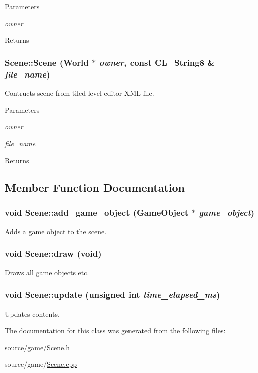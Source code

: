 \begin{DoxyParams}{Parameters}
\item[{\em owner}]\end{DoxyParams}
\begin{DoxyReturn}{Returns}

\end{DoxyReturn}
\hypertarget{classScene_a2da1c2abcd1bde49c978e403c9748b04}{
\subsubsection[{Scene}]{\setlength{\rightskip}{0pt plus 5cm}Scene::Scene ({\bf World} $\ast$ {\em owner}, \/  const CL\_\-String8 \& {\em file\_\-name})}}
\label{classScene_a2da1c2abcd1bde49c978e403c9748b04}
Contructs scene from tiled level editor XML file.


\begin{DoxyParams}{Parameters}
\item[{\em owner}]\item[{\em file\_\-name}]\end{DoxyParams}
\begin{DoxyReturn}{Returns}

\end{DoxyReturn}


\subsection{Member Function Documentation}
\hypertarget{classScene_af4940a9c9e62cb5ced3e7f5206d903a3}{
\subsubsection[{add\_\-game\_\-object}]{\setlength{\rightskip}{0pt plus 5cm}void Scene::add\_\-game\_\-object ({\bf GameObject} $\ast$ {\em game\_\-object})}}
\label{classScene_af4940a9c9e62cb5ced3e7f5206d903a3}
Adds a game object to the scene. \hypertarget{classScene_a41fbbe388ea322df338648e66611ffcf}{
\subsubsection[{draw}]{\setlength{\rightskip}{0pt plus 5cm}void Scene::draw (void)}}
\label{classScene_a41fbbe388ea322df338648e66611ffcf}
Draws all game objects etc. \hypertarget{classScene_a065d1b88078a09f2b77e80f663a40b2d}{
\subsubsection[{update}]{\setlength{\rightskip}{0pt plus 5cm}void Scene::update (unsigned int {\em time\_\-elapsed\_\-ms})}}
\label{classScene_a065d1b88078a09f2b77e80f663a40b2d}
Updates contents. 

The documentation for this class was generated from the following files:\begin{DoxyCompactItemize}
\item 
source/game/\hyperlink{Scene_8h}{Scene.h}\item 
source/game/\hyperlink{Scene_8cpp}{Scene.cpp}\end{DoxyCompactItemize}
